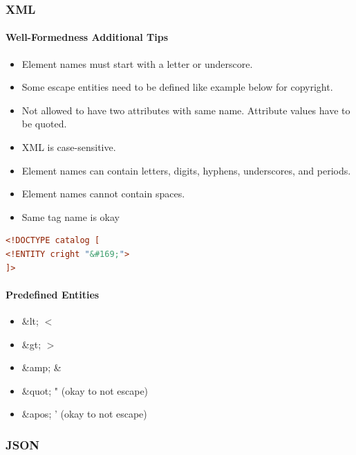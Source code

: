 \subsubsection{XML}


\paragraph{Well-Formedness Additional Tips}
\begin{itemize}
    \item Element names must start with a letter or underscore.
    \item Some escape entities need to be defined like example below for copyright. %
    \item Not allowed to have two attributes with same name. Attribute values have to be quoted.
    \item XML is case-sensitive.
    \item Element names can contain letters, digits, hyphens, underscores, and periods.
    \item Element names cannot contain spaces.
    \item Same tag name is okay
\end{itemize}

\begin{lstlisting}[language=XML]
<!DOCTYPE catalog [
<!ENTITY cright "&#169;">
]>
\end{lstlisting}

\paragraph{Predefined Entities}
\begin{itemize}
    \item \&lt; $<$
    \item \&gt; $>$
    \item \&amp; \&
    \item \&quot; " (okay to not escape)
    \item \&apos; ' (okay to not escape) %
\end{itemize}



\subsubsection{JSON}

